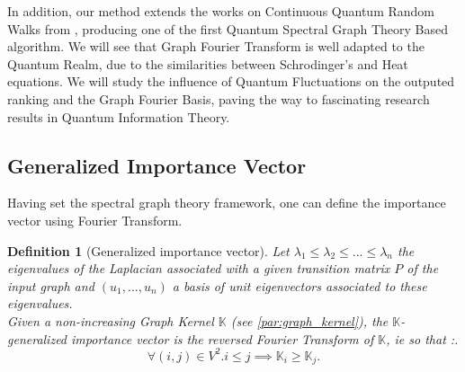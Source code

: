 \documentclass{article}
\newtheorem{definition}{Definition}[section]
\begin{document}
In addition, our method extends the works on Continuous Quantum Random Walks from \cite{sánchez-burillo_duch_gómez-gardeñes_zueco_2012}, producing one of the first Quantum Spectral Graph Theory Based algorithm. We will see that Graph Fourier Transform is well adapted to the Quantum Realm, due to the similarities between Schrodinger's and Heat equations. We will study the influence of Quantum Fluctuations on the outputed ranking and the Graph Fourier Basis, paving the way to fascinating research results in Quantum Information Theory. 
 
\subsection{Generalized Importance Vector}
Having set the spectral graph theory framework, one can define the importance vector using Fourier Transform.\\

\begin{definition}[Generalized importance vector]\label{def:generalized_importance_vector}
Let $\lambda_1 \leq \lambda_2 \leq ... \leq \lambda_n$ the eigenvalues of the Laplacian associated with a given transition matrix $P$ of the input graph and $(u_1, ..., u_n)$ a basis of unit eigenvectors associated to these eigenvalues.\\

Given a non-increasing Graph Kernel $\mathbb{K}$ (see \ref{par:graph_kernel}), the $\mathbb{K}$-generalized importance vector is the reversed Fourier Transform of $\mathbb{K}$, ie so that :.
\begin{equation}
    \forall (i,j) \in V^2. i \leq j \implies \mathbb{K}_i \geq \mathbb{K}_j.
\end{equation}

\end{definition}
\end{document}
